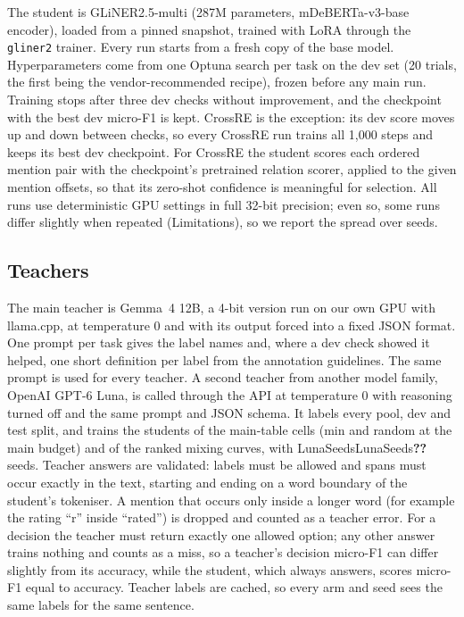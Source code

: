 \documentclass[11pt]{article}
\newcommand{\res}[1]{\ifcsname #1\endcsname\csname #1\endcsname\else\textbf{??}\fi}
\begin{document}
The student is GLiNER2.5-multi \citep{gliner25multi} (287M parameters, mDeBERTa-v3-base encoder), loaded from a pinned snapshot, trained with LoRA \citep{lora2021} through the \texttt{gliner2} trainer. Every run starts from a fresh copy of the base model. Hyperparameters come from one Optuna search per task on the dev set (20 trials, the first being the vendor-recommended recipe), frozen before any main run. Training stops after three dev checks without improvement, and the checkpoint with the best dev micro-F1 is kept. CrossRE is the exception: its dev score moves up and down between checks, so every CrossRE run trains all 1{,}000 steps and keeps its best dev checkpoint. For CrossRE the student scores each ordered mention pair with the checkpoint's pretrained relation scorer, applied to the given mention offsets, so that its zero-shot confidence is meaningful for selection. All runs use deterministic GPU settings in full 32-bit precision; even so, some runs differ slightly when repeated (Limitations), so we report the spread over seeds.

\subsection{Teachers}

The main teacher is Gemma~4 12B, a 4-bit version run on our own GPU with llama.cpp, at temperature 0 and with its output forced into a fixed JSON format. One prompt per task gives the label names and, where a dev check showed it helped, one short definition per label from the annotation guidelines. The same prompt is used for every teacher. A second teacher from another model family, OpenAI GPT-6 Luna, is called through the API at temperature 0 with reasoning turned off and the same prompt and JSON schema. It labels every pool, dev and test split, and trains the students of the main-table cells (min and random at the main budget) and of the ranked mixing curves, with \res{LunaSeeds} seeds. Teacher answers are validated: labels must be allowed and spans must occur exactly in the text, starting and ending on a word boundary of the student's tokeniser. A mention that occurs only inside a longer word (for example the rating ``r'' inside ``rated'') is dropped and counted as a teacher error. For a decision the teacher must return exactly one allowed option; any other answer trains nothing and counts as a miss, so a teacher's decision micro-F1 can differ slightly from its accuracy, while the student, which always answers, scores micro-F1 equal to accuracy. Teacher labels are cached, so every arm and seed sees the same labels for the same sentence.
\end{document}
